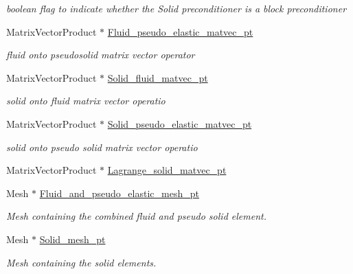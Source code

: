 \begin{DoxyCompactItemize}
\begin{DoxyCompactList}\small\item\em boolean flag to indicate whether the Solid preconditioner is a block preconditioner \end{DoxyCompactList}\item 
Matrix\+Vector\+Product $\ast$ \hyperlink{classoomph_1_1PseudoElasticFSIPreconditioner_a77c8b262ee8535947e52f36462544eec}{Fluid\+\_\+pseudo\+\_\+elastic\+\_\+matvec\+\_\+pt}
\begin{DoxyCompactList}\small\item\em fluid onto pseudosolid matrix vector operator \end{DoxyCompactList}\item 
Matrix\+Vector\+Product $\ast$ \hyperlink{classoomph_1_1PseudoElasticFSIPreconditioner_a8699afc5b64ec0c3db5c3cea5fd60c18}{Solid\+\_\+fluid\+\_\+matvec\+\_\+pt}
\begin{DoxyCompactList}\small\item\em solid onto fluid matrix vector operatio \end{DoxyCompactList}\item 
Matrix\+Vector\+Product $\ast$ \hyperlink{classoomph_1_1PseudoElasticFSIPreconditioner_a05eb73f45602a85e5dfb0a9cd10a488e}{Solid\+\_\+pseudo\+\_\+elastic\+\_\+matvec\+\_\+pt}
\begin{DoxyCompactList}\small\item\em solid onto pseudo solid matrix vector operatio \end{DoxyCompactList}\item 
Matrix\+Vector\+Product $\ast$ \hyperlink{classoomph_1_1PseudoElasticFSIPreconditioner_a1129dcb6e7e335aca44acdb4231adc38}{Lagrange\+\_\+solid\+\_\+matvec\+\_\+pt}
\item 
Mesh $\ast$ \hyperlink{classoomph_1_1PseudoElasticFSIPreconditioner_a9d8025b022a2ca180210da2f7979dfe2}{Fluid\+\_\+and\+\_\+pseudo\+\_\+elastic\+\_\+mesh\+\_\+pt}
\begin{DoxyCompactList}\small\item\em Mesh containing the combined fluid and pseudo solid element. \end{DoxyCompactList}\item 
Mesh $\ast$ \hyperlink{classoomph_1_1PseudoElasticFSIPreconditioner_afd02372d56906a9f86c5b00bf50297aa}{Solid\+\_\+mesh\+\_\+pt}
\begin{DoxyCompactList}\small\item\em Mesh containing the solid elements. \end{DoxyCompactList}\item 

\end{DoxyCompactItemize}
